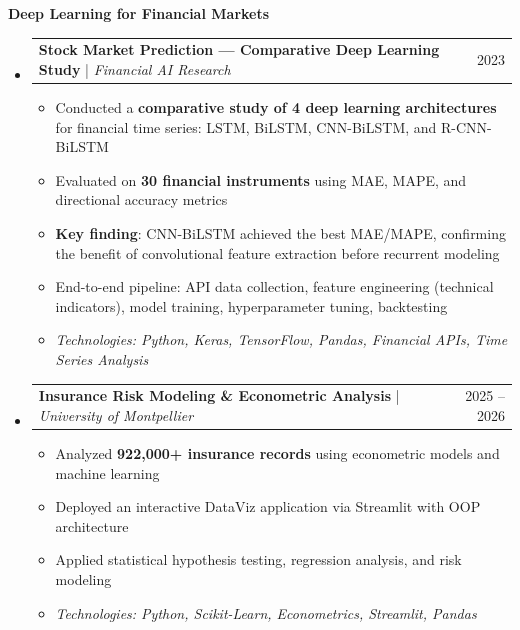 \documentclass[11pt,a4paper]{article}
\makeatletter
\newcommand{\subspace}{\vspace{0.5em}}
\newcommand{\cvsubsection}[1]{
    \subspace
    \noindent\textcolor{primary}{\large \textbf{#1}}
    \par\vspace{0.3em}
}
\newcommand{\headerrow}[2]{
    \begin{tabular*}{\linewidth}{l@{\extracolsep{\fill}}r}
    #1 & \textcolor{primary}{#2} \\
    \end{tabular*}
}
\makeatother
\begin{document}
\cvsubsection{Deep Learning for Financial Markets}
\begin{itemize}[leftmargin=1em, label={}]
    \item
    \headerrow{\textbf{Stock Market Prediction — Comparative Deep Learning Study} | \emph{Financial AI Research}}{2023}
    \begin{itemize}[leftmargin=1.5em, label=$\bullet$, nosep]
        \item Conducted a \textbf{comparative study of 4 deep learning architectures} for financial time series: LSTM, BiLSTM, CNN-BiLSTM, and R-CNN-BiLSTM
        \item Evaluated on \textbf{30 financial instruments} using MAE, MAPE, and directional accuracy metrics
        \item \textbf{Key finding}: CNN-BiLSTM achieved the best MAE/MAPE, confirming the benefit of convolutional feature extraction before recurrent modeling
        \item End-to-end pipeline: API data collection, feature engineering (technical indicators), model training, hyperparameter tuning, backtesting
        \item \emph{Technologies: Python, Keras, TensorFlow, Pandas, Financial APIs, Time Series Analysis}
    \end{itemize}

    \subspace 
    \item
    \headerrow{\textbf{Insurance Risk Modeling \& Econometric Analysis} | \emph{University of Montpellier}}{2025 -- 2026}
    \begin{itemize}[leftmargin=1.5em, label=$\bullet$, nosep]
        \item Analyzed \textbf{922,000+ insurance records} using econometric models and machine learning
        \item Deployed an interactive DataViz application via Streamlit with OOP architecture
        \item Applied statistical hypothesis testing, regression analysis, and risk modeling
        \item \emph{Technologies: Python, Scikit-Learn, Econometrics, Streamlit, Pandas}
    \end{itemize}
\end{itemize}
\end{document}

